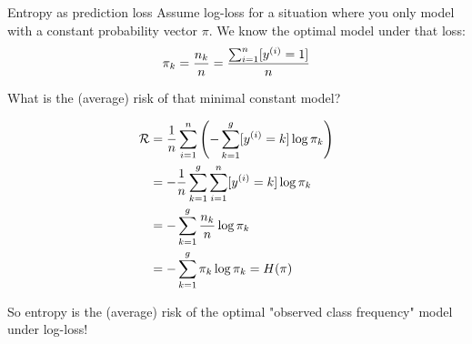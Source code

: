 \begin{vbframe}{Entropy as prediction loss}
Assume log-loss for a situation where you only model with a constant probability vector $\pi$. We know the optimal model under that loss: 
$$\pi_k = \frac{n_k}{n} = \frac{\sum_{i=1}^n [y^{(i)} = 1]}{n}$$

What is the (average) risk of that minimal constant model?

\framebreak

\begin{align*}
  \mathcal{R} &= \frac{1}{n} \sum_{i=1}^n \left( -\sum_{k=1}^g [y^{(i)} = k]\log \pi_k \right)  \\
        &= - \frac{1}{n} \sum_{k=1}^g \sum_{i=1}^n [y^{(i)} = k]\log \pi_k  \\
        &= -\sum_{k=1}^g \frac{n_k}{n}\log \pi_k \\
        &= -\sum_{k=1}^g \pi_k \log \pi_k = H(\pi) 
\end{align*}

So entropy is the (average) risk of the optimal "observed class frequency" model under log-loss! 
 
\end{vbframe}

  
\endlecture


